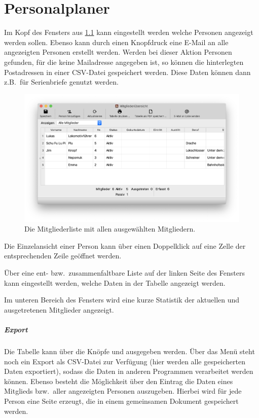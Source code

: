 \chapter{Personalplaner}\label{personal:mitglieder}
Im Kopf des Fensters aus \cref{fig:personal:mitglieder} kann eingestellt werden welche Personen angezeigt werden sollen.
Ebenso kann durch einen Knopfdruck eine E-Mail an alle angezeigten Personen erstellt werden.
Werden bei dieser Aktion Personen gefunden, für die keine Mailadresse angegeben ist,
so können die hinterlegten Postadressen in einer CSV-Datei gespeichert werden.
Diese Daten können dann z.B.\ für Serienbriefe genutzt werden.


\begin{figure}[!h]
	\includegraphics[width=\textwidth]{img/personal-liste}
	\caption{Die Mitgliederliste mit allen ausgewählten Mitgliedern.}
	\label{fig:personal:mitglieder}
\end{figure}

\begin{neu}
Die Einzelansicht einer Person kann über einen Doppelklick auf eine Zelle der entsprechenden Zeile geöffnet werden.

Über eine ent- bzw.\ zusammenfaltbare Liste auf der linken Seite des Fensters kann eingestellt werden,
welche Daten in der Tabelle angezeigt werden.
\end{neu}
Im unteren Bereich des Fensters wird eine kurze Statistik
der aktuellen und ausgetretenen Mitglieder angezeigt.

\paragraph{Export}
Die Tabelle kann über die Knöpfe  und  ausgegeben werden.
Über das Menü  steht noch ein Export als CSV-Datei zur Verfügung (hier werden alle gespeicherten Daten exportiert),
sodass die Daten in anderen Programmen verarbeitet werden können.
Ebenso besteht die Möglichkeit über den Eintrag  die Daten eines Mitglieds bzw.\ aller angezeigten Personen auszugeben.
Hierbei wird für jede Person eine Seite erzeugt, die in einem gemeinsamen Dokument gespeichert werden.
